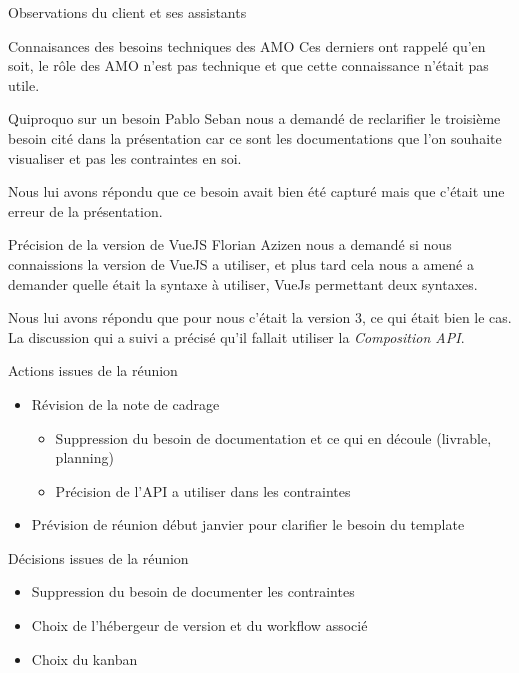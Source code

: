 \documentclass[]{article}
\begin{document}
\begin{section}{Observations du client et ses assistants}
\begin{subsection}{Connaisances des besoins techniques des AMO}
            Ces derniers ont rappelé qu'en soit, le rôle des AMO n'est pas technique et que cette connaissance n'était pas 
            utile.
        \end{subsection}

        \begin{subsection}{Quiproquo sur un besoin}
            Pablo Seban nous a demandé de reclarifier le troisième besoin cité dans la présentation car ce sont les 
            documentations que l'on souhaite visualiser et pas les contraintes en soi.

            Nous lui avons répondu que ce besoin avait bien été capturé mais que c'était une erreur de la présentation.
        \end{subsection}

        \begin{subsection}{Précision de la version de VueJS}
            Florian Azizen nous a demandé si nous connaissions la version de VueJS a utiliser, et plus tard cela nous a amené a
            demander quelle était la syntaxe à utiliser, VueJs permettant deux syntaxes.

            Nous lui avons répondu que pour nous c'était la version 3, ce qui était bien le cas. La discussion qui a suivi a 
            précisé qu'il fallait utiliser la \emph{Composition API}.
        \end{subsection}

    \end{section}

    \begin{section}{Actions issues de la réunion}
        \begin{itemize}
            \item Révision de la note de cadrage
            \begin{itemize}
                \item Suppression du besoin de documentation et ce qui en découle (livrable, planning)
                \item Précision de l'API a utiliser dans les contraintes
            \end{itemize}

            \item Prévision de réunion début janvier pour clarifier le besoin du template
        \end{itemize}
        
    \end{section}

    \begin{section}{Décisions issues de la réunion}
        \begin{itemize}
            \item Suppression du besoin de documenter les contraintes
            \item Choix de l'hébergeur de version et du workflow associé
            \item Choix du kanban
        \end{itemize}
        
    \end{section}
\end{document}
